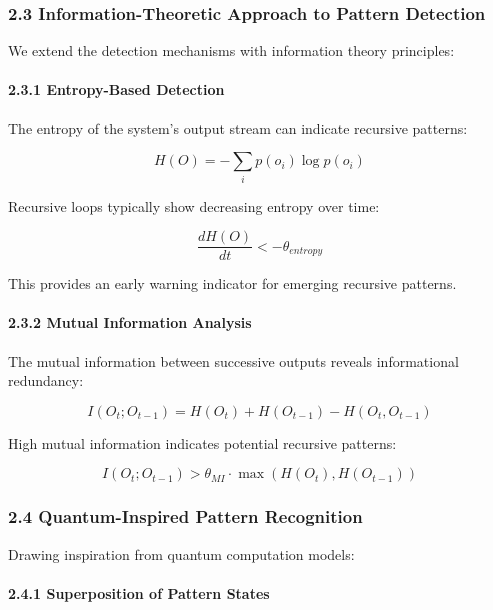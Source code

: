\documentclass[
]{article}
\begin{document}
\subsubsection{2.3 Information-Theoretic Approach to Pattern
Detection}\label{information-theoretic-approach-to-pattern-detection}

We extend the detection mechanisms with information theory principles:

\paragraph{2.3.1 Entropy-Based Detection}\label{entropy-based-detection}

The entropy of the system's output stream can indicate recursive
patterns:

\[H(O) = -\sum_{i} p(o_i) \log p(o_i)\]

Recursive loops typically show decreasing entropy over time:

\[\frac{dH(O)}{dt} < -\theta_{entropy}\]

This provides an early warning indicator for emerging recursive
patterns.

\paragraph{2.3.2 Mutual Information
Analysis}\label{mutual-information-analysis}

The mutual information between successive outputs reveals informational
redundancy:

\[I(O_t; O_{t-1}) = H(O_t) + H(O_{t-1}) - H(O_t, O_{t-1})\]

High mutual information indicates potential recursive patterns:

\[I(O_t; O_{t-1}) > \theta_{MI} \cdot \max(H(O_t), H(O_{t-1}))\]

\subsubsection{2.4 Quantum-Inspired Pattern
Recognition}\label{quantum-inspired-pattern-recognition}

Drawing inspiration from quantum computation models:

\paragraph{2.4.1 Superposition of Pattern
States}\label{superposition-of-pattern-states}
\end{document}
